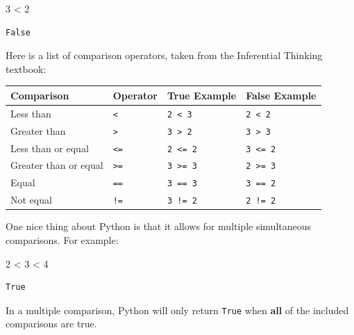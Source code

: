 \documentclass[
  11pt,
]{article}
\newenvironment{Shaded}{\begin{snugshade}}{\end{snugshade}}
\newcommand{\DecValTok}[1]{\textcolor[rgb]{0.68,0.00,0.00}{#1}}
\newcommand{\OperatorTok}[1]{\textcolor[rgb]{0.37,0.37,0.37}{#1}}
\begin{document}
\begin{Shaded}
\begin{Highlighting}[]
\DecValTok{3} \OperatorTok{\textless{}} \DecValTok{2}
\end{Highlighting}
\end{Shaded}

\begin{verbatim}
False
\end{verbatim}

Here is a list of comparison operators, taken from the Inferential
Thinking textbook:

\begin{longtable}[]{@{}llll@{}}
\toprule\noalign{}
Comparison & Operator & True Example & False Example \\
\midrule\noalign{}
\endhead
\bottomrule\noalign{}
\endlastfoot
Less than & \texttt{\textless{}} & \texttt{2\ \textless{}\ 3} &
\texttt{2\ \textless{}\ 2} \\
Greater than & \texttt{\textgreater{}} & \texttt{3\ \textgreater{}\ 2} &
\texttt{3\ \textgreater{}\ 3} \\
Less than or equal & \texttt{\textless{}=} & \texttt{2\ \textless{}=\ 2}
& \texttt{3\ \textless{}=\ 2} \\
Greater than or equal & \texttt{\textgreater{}=} &
\texttt{3\ \textgreater{}=\ 3} & \texttt{2\ \textgreater{}=\ 3} \\
Equal & \texttt{==} & \texttt{3\ ==\ 3} & \texttt{3\ ==\ 2} \\
Not equal & \texttt{!=} & \texttt{3\ !=\ 2} & \texttt{2\ !=\ 2} \\
\end{longtable}

One nice thing about Python is that it allows for multiple simultaneous
comparisons. For example:

\begin{Shaded}
\begin{Highlighting}[]
\DecValTok{2} \OperatorTok{\textless{}} \DecValTok{3} \OperatorTok{\textless{}} \DecValTok{4}
\end{Highlighting}
\end{Shaded}

\begin{verbatim}
True
\end{verbatim}

\begin{tcolorbox}[enhanced jigsaw, bottomrule=.15mm, colframe=quarto-callout-important-color-frame, coltitle=black, left=2mm, title=\textcolor{quarto-callout-important-color}{\faExclamation}\hspace{0.5em}{Important}, opacityback=0, opacitybacktitle=0.6, leftrule=.75mm, breakable, bottomtitle=1mm, toprule=.15mm, rightrule=.15mm, arc=.35mm, titlerule=0mm, colback=white, toptitle=1mm, colbacktitle=quarto-callout-important-color!10!white]

In a multiple comparison, Python will only return \texttt{True} when
\textbf{all} of the included comparisons are true.

\end{tcolorbox}
\end{document}
